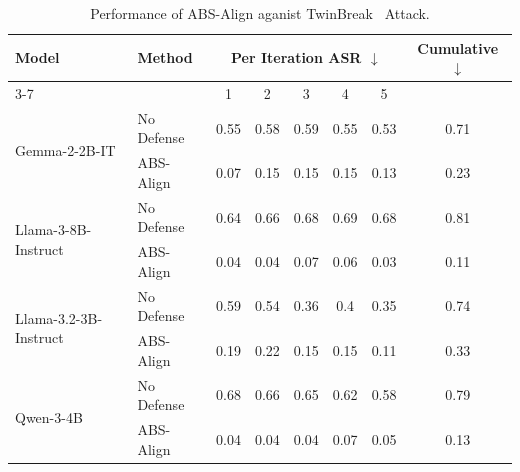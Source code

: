 \begin{table}[htbp]
    \centering
    \caption{Performance of ABS-Align aganist TwinBreak~\cite{twinbreak} Attack.}
    \label{tab:01_twinbreak_iters}

    \setlength{\tabcolsep}{4pt}
    \renewcommand{\arraystretch}{0.9}
    \small
    \begin{tabular}{ll ccccc c}
        \toprule
        \multirow{2}{*}{\textbf{Model}} & \multirow{2}{*}{\textbf{Method}} & \multicolumn{5}{c}{\textbf{Per Iteration ASR} $\downarrow$} & \multirow{2}{*}{\textbf{Cumulative} $\downarrow$} \\
        \cmidrule(lr){3-7}
         & & 1 & 2 & 3 & 4 & 5 & \\
        \midrule
        
        \multirow{2}{*}{Gemma-2-2B-IT}
         & No Defense       & 0.55 & 0.58 & 0.59 & 0.55 & 0.53 & 0.71 \\
         & ABS-Align    & 0.07 & 0.15 & 0.15 & 0.15 & 0.13 & 0.23 \\
        \midrule
        
        \multirow{2}{*}{Llama-3-8B-Instruct}
         & No Defense       & 0.64 & 0.66 & 0.68 & 0.69 & 0.68 & 0.81 \\
         & ABS-Align   & 0.04 & 0.04 & 0.07 & 0.06 & 0.03 & 0.11  \\
        \midrule
        \multirow{2}{*}{Llama-3.2-3B-Instruct}
        & No Defense & 0.59 & 0.54 & 0.36 & 0.4 & 0.35 & 0.74 \\
        & ABS-Align & 0.19 & 0.22 & 0.15 & 0.15 & 0.11 & 0.33 \\
        \midrule
        \multirow{2}{*}{Qwen-3-4B}
         & No Defense  &   0.68  &  0.66 & 0.65 & 0.62 & 0.58 & 0.79 \\
         & ABS-Align  & 0.04 & 0.04 & 0.04 & 0.07 & 0.05 & 0.13 \\
        \bottomrule
    \end{tabular}
\end{table}
